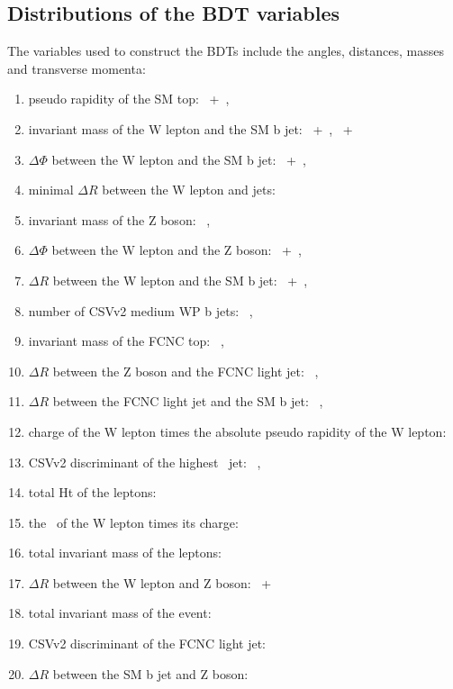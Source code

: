 \subsection{Distributions of the BDT variables}
\label{sec:BDTvars}
The variables used to construct the BDTs include the angles, distances, masses and transverse momenta:
\begin{enumerate}
	\item pseudo rapidity of the SM top: \TTSR\ +\STSR\ \Zut  , \STSR\ \Zct 
	\item invariant mass of the W lepton and the SM b jet: \TTSR\ +\STSR\ \Zut , \TTSR\ +\STSR\ \Zct\ 
	\item $\Delta \Phi$ between the W lepton and the SM b jet: \TTSR\ +\STSR\ \Zut , \STSR\ \Zct\ 
	\item minimal $\Delta R$ between the W lepton and jets: \TTSR\ \Zut 
	\item invariant mass of the Z boson: \TTSR\ \Zut , \TTSR\ \Zct\ 
	\item $\Delta \Phi$ between the W lepton and the Z boson: \TTSR\ +\STSR\ \Zut , \TTSR\ \Zct\ 
	\item $\Delta R$ between the W lepton and the SM b jet: \TTSR\ +\STSR\ \Zut , \TTSR\ \Zct\ 
	\item  number of CSVv2 medium WP b jets: \TTSR\ \Zut , \TTSR\ \Zct\ 
	\item invariant mass of the FCNC top: \TTSR\ \Zut , \TTSR\ \Zct\ 
	\item $\Delta R$ between the Z boson and the FCNC light jet: \TTSR\ \Zut , \TTSR\ \Zct\ 
	\item $\Delta R$ between the FCNC light jet and the SM b jet: \TTSR\ \Zut , \TTSR\ \Zct\ 
	\item charge of the W lepton times the absolute pseudo rapidity of the W lepton: \STSR\ \Zut 
	\item CSVv2 discriminant of the highest \pt\ jet: \STSR\ \Zut , \STSR\ \Zct\ 
	\item total Ht of the leptons: \STSR\ \Zut 
	\item the \pt\ of the W lepton times its charge: \STSR\ \Zut 
	\item total invariant mass of the leptons: \STSR\ \Zct\ 
	\item $\Delta R$ between the W lepton and Z boson: \TTSR\ +\STSR\ \Zct\ 
	\item total invariant mass of the event: \TTSR\ \Zct\ 
	\item CSVv2 discriminant of the FCNC light jet: \TTSR\ \Zct\ 
	\item $\Delta R$ between the SM b jet and Z boson: \TTSR\ \Zct\ 
\end{enumerate}

